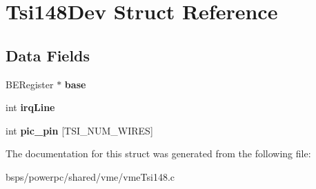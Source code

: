 \hypertarget{structTsi148Dev}{}\section{Tsi148\+Dev Struct Reference}
\label{structTsi148Dev}
\subsection*{Data Fields}
\begin{DoxyCompactItemize}
\item 
\mbox{\label{structTsi148Dev_a2801315c6b829a30ec1604e972ca9b7d}} 
B\+E\+Register $\ast$ {\bfseries base}
\item 
\mbox{\label{structTsi148Dev_a139dddf9dbfe0c0f23647f8848c8b07b}} 
int {\bfseries irq\+Line}
\item 
\mbox{\label{structTsi148Dev_a6041b462a7b5b6b293f785b1b4414551}} 
int {\bfseries pic\+\_\+pin} \mbox{[}T\+S\+I\+\_\+\+N\+U\+M\+\_\+\+W\+I\+R\+ES\mbox{]}
\end{DoxyCompactItemize}


The documentation for this struct was generated from the following file\+:\begin{DoxyCompactItemize}
\item 
bsps/powerpc/shared/vme/vme\+Tsi148.\+c\end{DoxyCompactItemize}
